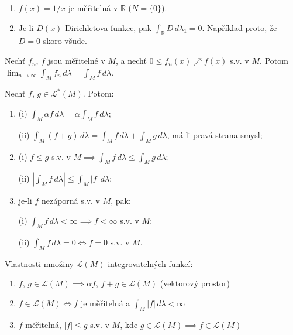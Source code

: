 \begin{priklad}
\begin{enumerate}[1.]
\item $f(x) = 1/x$ je měřitelná v $\mathbb{R}$ ($N = \{0\}$).

\item Je-li $D(x)$ Dirichletova funkce, pak
$\int_{\mathbb{R}} D \, d\lambda_1 = 0$. Například proto, že $D = 0$
skoro všude.
\end{enumerate}
\end{priklad}

\begin{veta}
Nechť $f_n$, $f$ jsou měřitelné v $M$, a nechť
$0 \le f_n(x) \nearrow f(x)$ s.v. v $M$. Potom
$\lim_{n \to \infty} \int_M f_n \, d\lambda = \int_M f \, d\lambda$.
\end{veta}

\begin{veta}
Nechť $f$, $g \in \mathcal{L}^*(M)$. Potom:
\begin{enumerate}[1.]
\item (i) $\int_M \alpha f \, d\lambda = \alpha \int_M f \, d\lambda$;

(ii) $\int_M (f + g) \, d\lambda = \int_M f \, d\lambda +
\int_M g \, d\lambda$, má-li pravá strana smysl;
\item (i) $f \le g$ s.v. v $M \implies \int_M f \, d\lambda \le
\int_M g \, d\lambda$;

(ii) $\left| \int_M f \, d\lambda \right| \le \int_M |f| \, d\lambda$;
\item je-li $f$ nezáporná s.v. v $M$, pak:

(i) $\int_M f \, d\lambda < \infty \implies f < \infty$ s.v. v $M$;

(ii) $\int_M f \, d\lambda = 0 \iff f = 0$ s.v. v $M$.
\end{enumerate}
\end{veta}

\begin{poznamka}
Vlastnosti množiny $\mathcal{L}(M)$ integrovatelných funkcí:
\begin{enumerate}[1.]
\item $f$, $g \in \mathcal{L}(M) \implies \alpha f$, $f + g \in
\mathcal{L}(M)$ (vektorový prostor)

\item $f \in \mathcal{L}(M) \iff f$ je měřitelná a
$\int_M |f| \, d\lambda < \infty$

\item $f$ měřitelná, $|f| \le g$ s.v. v $M$, kde
$g \in \mathcal{L}(M) \implies f \in \mathcal{L}(M)$
\end{enumerate}
\end{poznamka}


